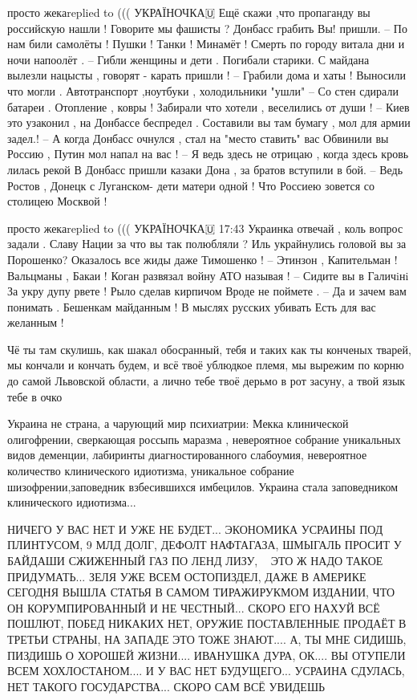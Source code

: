 просто жекаreplied to ((( УКРАЇНОЧКА🇺
Ещё скажи ,что пропаганду вы российскую нашли !
Говорите мы фашисты ? Донбасс грабить Вы! пришли.
--
По нам били самолёты ! Пушки ! Танки ! Минамёт !
Смерть по городу витала дни и ночи напоолёт .
--
Гибли женщины и дети . Погибали старики.
С майдана вылезли нацысты , говорят - карать пришли !
--
Грабили дома и хаты ! Выносили что могли .
Автотранспорт ,ноутбуки , холодильники "ушли"
--
Со стен сдирали батареи . Отопление , ковры !
Забирали что хотели , веселились от души !
--
Киев это узаконил , на Донбассе беспредел .
Составили вы там бумагу , мол для армии задел.!
--
А когда Донбасс очнулся , стал на "место ставить" вас
Обвинили вы Россию , Путин мол напал на вас !
--
Я ведь здесь не отрицаю , когда здесь кровь лилась рекой
В Донбасс пришли казаки Дона , за братов вступили в бой.
--
Ведь Ростов , Донецк с Луганском- дети матери одной !
Что Россиею зовется со столицею Москвой !

просто жекаreplied to ((( УКРАЇНОЧКА🇺
17:43
Украинка отвечай , коль вопрос задали .
Славу Нации за что вы так полюбляли ?
Иль украйнулись головой вы за Порошенко?
Оказалось все жиды даже Тимошенко !
--
Этинзон , Капительман !
Вальцманы , Бакаи !
Коган развязал войну
АТО называя !
--
Сидите вы в Галичiнi
За укру дупу рвете !
Рыло сделав кирпичом
Вроде не поймете .
--
Да и зачем вам понимать .
Бешенкам майданным !
В мыслях русских убивать
Есть для вас желанным !


Чё ты там скулишь, как шакал обосранный, тебя и таких как ты конченых тварей,
мы кончали и кончать будем, и всё твоё ублюдкое племя, мы вырежим по корню до
самой Львовской области, а лично тебе твоё дерьмо в рот засуну, а твой язык
тебе в очко


Украина не страна, а чарующий мир психиатрии: Мекка клинической олигофрении,
сверкающая россыпь маразма , невероятное собрание уникальных видов деменции,
лабиринты диагностированного слабоумия, невероятное количество клинического
идиотизма, уникальное собрание шизофрении,заповедник взбесившихся имбецилов.
Украина стала заповедником клинического идиотизма...


НИЧЕГО У ВАС НЕТ И УЖЕ НЕ БУДЕТ... ЭКОНОМИКА УСРАИНЫ ПОД ПЛИНТУСОМ, 9 МЛД ДОЛГ,
ДЕФОЛТ НАФТАГАЗА, ШМЫГАЛЬ ПРОСИТ У БАЙДАШИ СЖИЖЕННЫЙ ГАЗ ПО ЛЕНД ЛИЗУ,
🤣🤣🤣ЭТО Ж НАДО ТАКОЕ ПРИДУМАТЬ... ЗЕЛЯ УЖЕ ВСЕМ ОСТОПИЗДЕЛ, ДАЖЕ В АМЕРИКЕ
СЕГОДНЯ ВЫШЛА СТАТЬЯ В САМОМ ТИРАЖИРУКМОМ ИЗДАНИИ, ЧТО ОН КОРУМПИРОВАННЫЙ И НЕ
ЧЕСТНЫЙ... СКОРО ЕГО НАХУЙ ВСЁ ПОШЛЮТ, ПОБЕД НИКАКИХ НЕТ, ОРУЖИЕ ПОСТАВЛЕННЫЕ
ПРОДАЁТ В ТРЕТЬИ СТРАНЫ, НА ЗАПАДЕ ЭТО ТОЖЕ ЗНАЮТ.... А, ТЫ МНЕ СИДИШЬ, ПИЗДИШЬ
О ХОРОШЕЙ ЖИЗНИ.... ИВАНУШКА ДУРА, ОК.... ВЫ ОТУПЕЛИ ВСЕМ ХОХЛОСТАНОМ.... И У
ВАС НЕТ БУДУЩЕГО... УСРАИНА СДУЛАСЬ, НЕТ ТАКОГО ГОСУДАРСТВА... СКОРО САМ ВСЁ
УВИДЕШЬ

